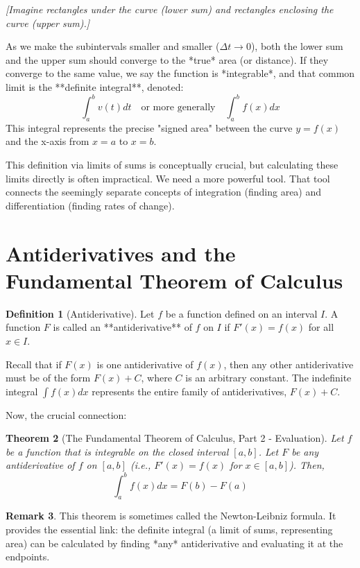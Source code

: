 \documentclass[11pt]{article}
\newtheorem{theorem}{Theorem}[section]
\theoremstyle{definition}
\newtheorem{definition}[theorem]{Definition}
\newtheorem{remark}[theorem]{Remark}
\theoremstyle{remark} %
\begin{document}
\begin{center}
\textit{[Imagine rectangles under the curve (lower sum) and rectangles enclosing the curve (upper sum).]}
\end{center}

As we make the subintervals smaller and smaller ($\Delta t \to 0$), both the lower sum and the upper sum should converge to the *true* area (or distance). If they converge to the same value, we say the function is *integrable*, and that common limit is the **definite integral**, denoted:
\[
\int_a^b v(t) dt \quad \text{or more generally} \quad \int_a^b f(x) dx
\]
This integral represents the precise "signed area" between the curve $y=f(x)$ and the x-axis from $x=a$ to $x=b$.

This definition via limits of sums is conceptually crucial, but calculating these limits directly is often impractical. We need a more powerful tool. That tool connects the seemingly separate concepts of integration (finding area) and differentiation (finding rates of change).

\section{Antiderivatives and the Fundamental Theorem of Calculus}

\begin{definition}[Antiderivative]
Let $f$ be a function defined on an interval $I$. A function $F$ is called an **antiderivative** of $f$ on $I$ if $F'(x) = f(x)$ for all $x \in I$.
\end{definition}

Recall that if $F(x)$ is one antiderivative of $f(x)$, then any other antiderivative must be of the form $F(x) + C$, where $C$ is an arbitrary constant. The indefinite integral $\int f(x) dx$ represents the entire family of antiderivatives, $F(x) + C$.

Now, the crucial connection:

\begin{theorem}[The Fundamental Theorem of Calculus, Part 2 - Evaluation]
Let $f$ be a function that is integrable on the closed interval $[a, b]$. Let $F$ be any antiderivative of $f$ on $[a, b]$ (i.e., $F'(x) = f(x)$ for $x \in [a, b]$). Then,
\[
\int_a^b f(x) dx = F(b) - F(a)
\]
\end{theorem}

\begin{remark}
This theorem is sometimes called the Newton-Leibniz formula. It provides the essential link: the definite integral (a limit of sums, representing area) can be calculated by finding *any* antiderivative and evaluating it at the endpoints.
\end{remark}
\end{document}
